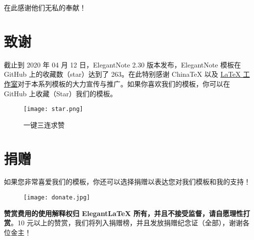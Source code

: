 \documentclass[cn,geye,blue,14pt,normal]{elegantnote}
\begin{document}
在此感谢他们无私的奉献！


\section{致谢}

截止到 2020 年 04 月 12 日，ElegantNote 2.30 版本发布，ElegantNote 模板在 GitHub 上的收藏数（star）达到了 263。在此特别感谢 China\TeX{} 以及 \href{http://www.latexstudio.net/}{\LaTeX{} 工作室}对于本系列模板的大力宣传与推广。如果你喜欢我们的模板，你可以在 GitHub 上收藏（Star）我们的模板。

\begin{figure}[htbp]
  \centering
  \texttt{[image: star.png]}
  \caption{一键三连求赞}
\end{figure}


\section{捐赠}

如果您非常喜爱我们的模板，你还可以选择捐赠以表达您对我们模板和我的支持！

\begin{figure}[htbp]
  \centering
  \texttt{[image: donate.jpg]}
\end{figure}

\textbf{赞赏费用的使用解释权归 Elegant\LaTeX{} 所有，并且不接受监督，请自愿理性打赏}。10 元以上的赞赏，我们将列入捐赠榜，并且发放捐赠纪念证（全部），谢谢各位金主！
\end{document}

